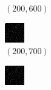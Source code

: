 \documentclass[a4paper, landscape]{article}
\begin{document}
\begin{figure}[H]
\begin{subfigure}{0.07\linewidth}
        \caption*{$(200, 600)$}
    \end{subfigure}
    \begin{subfigure}{0.07\linewidth}
        \centering
        \includegraphics[width=\linewidth]{omp/k = 200, m = 700.png}
        \caption*{$(200, 700)$}
    \end{subfigure}
    \begin{subfigure}{0.07\linewidth}
        \centering
        \includegraphics[width=\linewidth]{omp/k = 200, m = 800.png}

\end{subfigure}
\end{figure}
\end{document}
